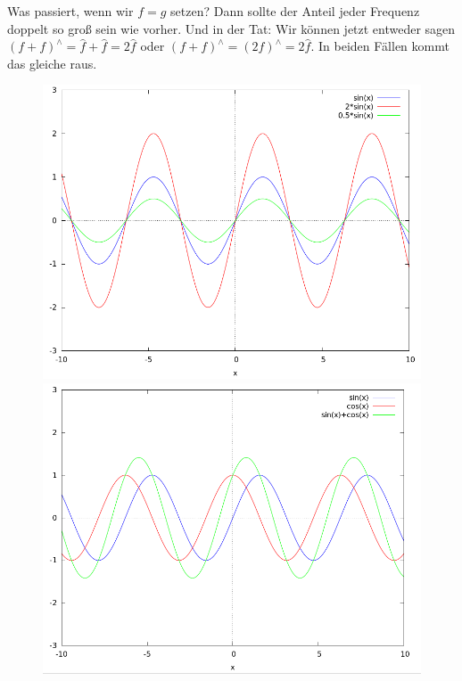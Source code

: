 \begin{remark}
\begin{enumerate}
    Was passiert, wenn wir $ f = g $ setzen? Dann sollte der Anteil jeder Frequenz doppelt so groß
    sein wie vorher. Und in der Tat: Wir können jetzt entweder sagen 
    $ (f + f)^{\wedge} = \widehat{f} + \widehat{f} = 2 \widehat{f} $ oder
    $ (f + f)^{\wedge} = (2f)^{\wedge} = 2 \widehat{f} $. In beiden Fällen kommt das gleiche raus.
    \begin{figure}[ht]
      \centering
      \begin{minipage}{0.49\linewidth}
        \centering
        \includegraphics[width=\linewidth]{Bilder/FT_Linear1}
      \end{minipage}
      \begin{minipage}{0.49\linewidth}
        \centering
        \includegraphics[width=\linewidth]{Bilder/FT_Linear2}

\end{minipage}
\end{figure}
\end{enumerate}
\end{remark}
